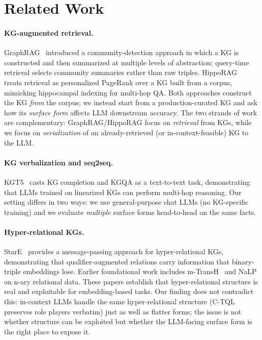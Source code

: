 \section{Related Work}\label{sec:related}

\paragraph{KG-augmented retrieval.}
GraphRAG~\citep{edge2024graphrag} introduced a community-detection
approach in which a KG is constructed and then summarized at
multiple levels of abstraction; query-time retrieval selects
community summaries rather than raw triples.
HippoRAG~\citep{gutierrez2024hipporag} treats retrieval as
personalized PageRank over a KG built from a corpus, mimicking
hippocampal indexing for multi-hop QA. Both approaches construct
the KG \emph{from} the corpus; we instead start from a
production-curated KG and ask how its \emph{surface form} affects
LLM downstream accuracy. The two strands of work are complementary:
GraphRAG/HippoRAG focus on \emph{retrieval} from KGs, while we
focus on \emph{serialization} of an already-retrieved (or
in-context-feasible) KG to the LLM.

\paragraph{KG verbalization and seq2seq.}
KGT5~\citep{saxena2022kgt5} casts KG completion and KGQA as a
text-to-text task, demonstrating that LLMs trained on linearized
KGs can perform multi-hop reasoning. Our setting differs in two
ways: we use general-purpose chat LLMs (no KG-specific training)
and we evaluate \emph{multiple} surface forms head-to-head on the
same facts.

\paragraph{Hyper-relational KGs.}
StarE~\citep{galkin2020stare} provides a message-passing approach
for hyper-relational KGs, demonstrating that qualifier-augmented
relations carry information that binary-triple embeddings lose.
Earlier foundational work includes m-TransH~\citep{wen2016mtransh}
and NaLP~\citep{guan2019nalp} on n-ary relational data. These
papers establish that hyper-relational structure is real and
exploitable for embedding-based tasks. Our finding does not
contradict this: in-context LLMs handle the same hyper-relational
structure (C-TQL preserves role players verbatim) just as well
as flatter forms; the issue is not whether structure can be
exploited but whether the LLM-facing surface form is the right
place to expose it.

